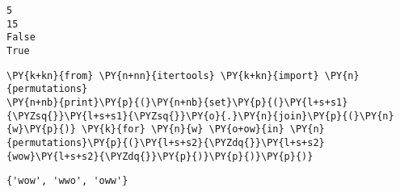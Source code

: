 \begin{Verbatim}
5
15
False
True

\end{Verbatim}


\begin{Verbatim}[commandchars=\\\{\}]
\PY{k+kn}{from} \PY{n+nn}{itertools} \PY{k+kn}{import} \PY{n}{permutations}
\PY{n+nb}{print}\PY{p}{(}\PY{n+nb}{set}\PY{p}{(}\PY{l+s+s1}{\PYZsq{}}\PY{l+s+s1}{\PYZsq{}}\PY{o}{.}\PY{n}{join}\PY{p}{(}\PY{n}{w}\PY{p}{)} \PY{k}{for} \PY{n}{w} \PY{o+ow}{in} \PY{n}{permutations}\PY{p}{(}\PY{l+s+s2}{\PYZdq{}}\PY{l+s+s2}{wow}\PY{l+s+s2}{\PYZdq{}}\PY{p}{)}\PY{p}{)}\PY{p}{)}
\end{Verbatim}

\begin{Verbatim}
{'wow', 'wwo', 'oww'}

\end{Verbatim}
